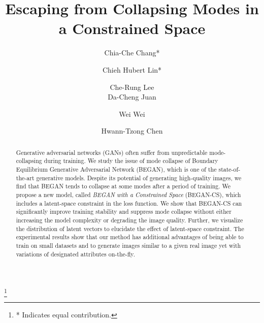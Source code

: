 \documentclass[runningheads]{llncs}
\newcommand\blfootnote[1]{\begingroup
  \renewcommand\thefootnote{}\footnote{#1}\addtocounter{footnote}{-1}\endgroup
}
\begin{document}
\pagestyle{headings}
\mainmatter

\title{Escaping from Collapsing Modes in a Constrained Space} 



\author{
    Chia-Che Chang* \and Chieh Hubert Lin* \and Che-Rung Lee \\
    Da-Cheng Juan \and Wei Wei \and Hwann-Tzong Chen
}



\maketitle

\blfootnote{* Indicates equal contribution.}

\begin{abstract}

    Generative adversarial networks (GANs) often suffer from unpredictable mode-collapsing during training. We study the issue of mode collapse of Boundary Equilibrium Generative Adversarial Network (BEGAN), which is one of the state-of-the-art generative models. Despite its potential of generating high-quality images, we find that BEGAN tends to collapse at some modes after a period of training. We propose a new model, called \emph{BEGAN with a Constrained Space} (BEGAN-CS), which includes a latent-space constraint in the loss function. We show that BEGAN-CS can significantly improve training stability and suppress mode collapse without either increasing the model complexity or degrading the image quality. Further, we visualize the distribution of latent vectors to elucidate the effect of latent-space constraint. The experimental results show that our method has additional advantages of being able to train on small datasets and to generate images similar to a given real image yet with variations of designated attributes on-the-fly.
    
\end{abstract}
\end{document}
